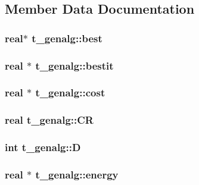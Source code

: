 \subsection{\-Member \-Data \-Documentation}
\hypertarget{structt__genalg_a6a403b49cfea47163188629017873827}{
\subsubsection[{best}]{\setlength{\rightskip}{0pt plus 5cm}real$\ast$ {\bf t\-\_\-genalg\-::best}}}\label{structt__genalg_a6a403b49cfea47163188629017873827}
\hypertarget{structt__genalg_afe342c720f3cf3e244d25cf3a35f6921}{
\subsubsection[{bestit}]{\setlength{\rightskip}{0pt plus 5cm}real $\ast$ {\bf t\-\_\-genalg\-::bestit}}}\label{structt__genalg_afe342c720f3cf3e244d25cf3a35f6921}
\hypertarget{structt__genalg_af62f1fb99b26ac7c1d3544dd02e07e22}{
\subsubsection[{cost}]{\setlength{\rightskip}{0pt plus 5cm}real $\ast$ {\bf t\-\_\-genalg\-::cost}}}\label{structt__genalg_af62f1fb99b26ac7c1d3544dd02e07e22}
\hypertarget{structt__genalg_a299c39ff23af85c2a5b20faa254a089e}{
\subsubsection[{\-C\-R}]{\setlength{\rightskip}{0pt plus 5cm}real {\bf t\-\_\-genalg\-::\-C\-R}}}\label{structt__genalg_a299c39ff23af85c2a5b20faa254a089e}
\hypertarget{structt__genalg_a076e7a97126055e41702ec2cb079220c}{
\subsubsection[{\-D}]{\setlength{\rightskip}{0pt plus 5cm}int {\bf t\-\_\-genalg\-::\-D}}}\label{structt__genalg_a076e7a97126055e41702ec2cb079220c}
\hypertarget{structt__genalg_a493d88b35f28842f3493f7842437a4ab}{
\subsubsection[{energy}]{\setlength{\rightskip}{0pt plus 5cm}real $\ast$ {\bf t\-\_\-genalg\-::energy}}}\label{structt__genalg_a493d88b35f28842f3493f7842437a4ab}
